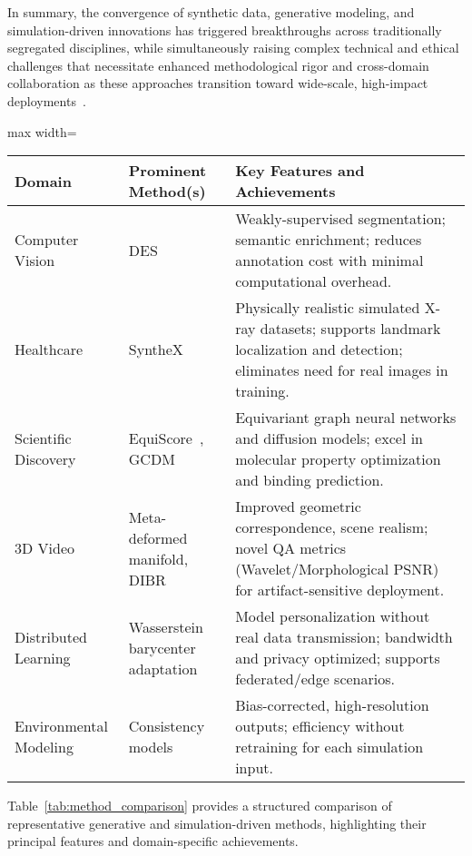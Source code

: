 \documentclass[sigconf]{acmart}
\begin{document}
In summary, the convergence of synthetic data, generative modeling, and simulation-driven innovations has triggered breakthroughs across traditionally segregated disciplines, while simultaneously raising complex technical and ethical challenges that necessitate enhanced methodological rigor and cross-domain collaboration as these approaches transition toward wide-scale, high-impact deployments~\cite{ref59,ref72,ref73,ref74}.

\begin{table*}[htbp]
\centering
\caption{Representative Generative and Simulation Methods in Selected Application Domains}
\label{tab:method_comparison}
\begin{adjustbox}{max width=\textwidth}
\begin{tabular}{lll}
\toprule
\textbf{Domain} & \textbf{Prominent Method(s)} & \textbf{Key Features and Achievements} \\
\midrule
Computer Vision & DES~\cite{ref61} & Weakly-supervised segmentation; semantic enrichment; reduces annotation cost with minimal computational overhead. \\
Healthcare & SyntheX~\cite{ref65} & Physically realistic simulated X-ray datasets; supports landmark localization and detection; eliminates need for real images in training. \\
Scientific Discovery & EquiScore~\cite{ref59}, GCDM~\cite{ref74} & Equivariant graph neural networks and diffusion models; excel in molecular property optimization and binding prediction. \\
3D Video & Meta-deformed manifold, DIBR~\cite{ref98,ref99} & Improved geometric correspondence, scene realism; novel QA metrics (Wavelet/Morphological PSNR) for artifact-sensitive deployment. \\
Distributed Learning & Wasserstein barycenter adaptation~\cite{ref72} & Model personalization without real data transmission; bandwidth and privacy optimized; supports federated/edge scenarios. \\
Environmental Modeling & Consistency models~\cite{ref73} & Bias-corrected, high-resolution outputs; efficiency without retraining for each simulation input. \\
\bottomrule
\end{tabular}
\end{adjustbox}
\end{table*}

Table~\ref{tab:method_comparison} provides a structured comparison of representative generative and simulation-driven methods, highlighting their principal features and domain-specific achievements.
\end{document}
